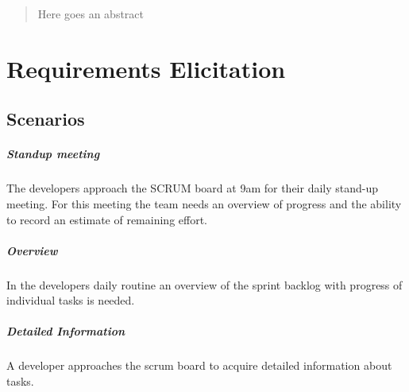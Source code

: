\documentclass[]{report}
\title{}
\author{}
\begin{document}
\maketitle

\tableofcontents

\begin{abstract}
Here goes an abstract
\end{abstract}

\chapter{Requirements Elicitation}

\section{Scenarios}

\paragraph{Standup meeting}
The developers approach the SCRUM board at 9am for their daily stand-up meeting. For this meeting the team needs an overview of progress and the ability to record an estimate of remaining effort.  

\paragraph{Overview}
In the developers daily routine an overview of the sprint backlog with progress of individual tasks is needed.

\paragraph{Detailed Information}
A developer approaches the scrum board to acquire detailed information about tasks. 
\end{document}
